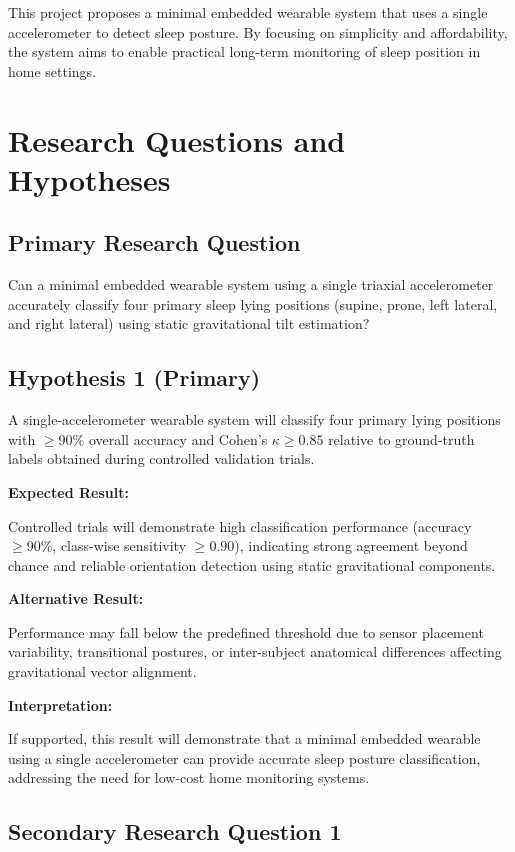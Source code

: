 \documentclass[10pt,journal]{IEEEtran}
\begin{document}
This project proposes a minimal embedded wearable system that uses a single accelerometer to detect sleep posture. By focusing on simplicity and affordability, the system aims to enable practical long-term monitoring of sleep position in home settings.

\section{Research Questions and Hypotheses}

\subsection{Primary Research Question}

Can a minimal embedded wearable system using a single triaxial accelerometer accurately classify four primary sleep lying positions (supine, prone, left lateral, and right lateral) using static gravitational tilt estimation?

\subsection{Hypothesis 1 (Primary)}

A single-accelerometer wearable system will classify four primary lying positions with $\geq 90\%$ overall accuracy and Cohen's $\kappa \geq 0.85$ relative to ground-truth labels obtained during controlled validation trials.

\textbf{Expected Result:}

Controlled trials will demonstrate high classification performance (accuracy $\geq 90\%$, class-wise sensitivity $\geq 0.90$), indicating strong agreement beyond chance and reliable orientation detection using static gravitational components.

\textbf{Alternative Result:}

Performance may fall below the predefined threshold due to sensor placement variability, transitional postures, or inter-subject anatomical differences affecting gravitational vector alignment.

\textbf{Interpretation:}

If supported, this result will demonstrate that a minimal embedded wearable using a single accelerometer can provide accurate sleep posture classification, addressing the need for low-cost home monitoring systems.

\subsection{Secondary Research Question 1}
\end{document}
